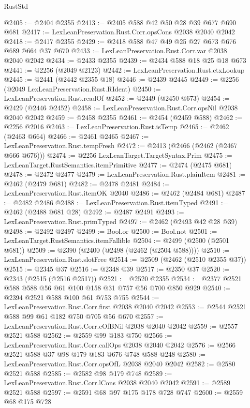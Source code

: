 \begin{lexlean}{RustStd}
\begin{coremodule}
@2405 := @2404 @2355
@2413 := @2405 @588 @42 @50 @28 @39 @677 @690 @681
@2417 := LexLeanPreservation.Rust.Corr.opsCons @2038 @2040 @2042
@2418 := @2417 @2355
@2429 := @2418 @588 @47 @49 @25 @27 @673 @676 @689 @664 @37 @670
@2433 := LexLeanPreservation.Rust.Corr.var @2038 @2040 @2042
@2434 := @2433 @2355
@2439 := @2434 @588 @18 @25 @18 @673
@2441 := @2256 (@2049 @2123)
@2442 := LexLeanPreservation.Rust.ctxLookup
@2445 := @2441 (@2442 @2355 @18)
@2446 := @2439 @2445
@2449 := @2256 (@2049 LexLeanPreservation.Rust.RIdent)
@2450 := LexLeanPreservation.Rust.readOf
@2452 := @2449 (@2450 @673)
@2454 := @2429 (@2446 @2452)
@2458 := LexLeanPreservation.Rust.Corr.opsNil @2038 @2040 @2042
@2459 := @2458 @2355
@2461 := @2454 (@2459 @588)
@2462 := @2256 @2016
@2463 := LexLeanPreservation.Rust.isTemp
@2465 := @2462 (@2463 @664)
@2466 := @2461 @2465
@2467 := LexLeanPreservation.Rust.tempFresh
@2472 := @2413 (@2466 (@2462 (@2467 @666 @676)))
@2474 := @2256 LexLeanTarget.TargetSyntax.Prim
@2475 := LexLeanTarget.RustSemantics.itemPrimitive
@2477 := @2474 (@2475 @681)
@2478 := @2472 @2477
@2479 := LexLeanPreservation.Rust.plainItem
@2481 := @2462 (@2479 @681)
@2482 := @2478 @2481
@2484 := LexLeanPreservation.Rust.itemOK @2040
@2486 := @2462 (@2484 @681)
@2487 := @2482 @2486
@2488 := LexLeanPreservation.Rust.itemTyped
@2491 := @2462 (@2488 @681 @28)
@2492 := @2487 @2491
@2493 := LexLeanPreservation.Rust.primTyped
@2497 := @2462 (@2493 @42 @28 @39)
@2498 := @2492 @2497
@2499 := Bool.or
@2500 := Bool.not
@2501 := LexLeanTarget.RustSemantics.itemFallible
@2504 := @2499 (@2500 (@2501 @681))
@2509 := @2390 (@2400 (@2498 (@2462 (@2504 @588))))
@2510 := LexLeanPreservation.Rust.slotFree
@2514 := @2509 (@2462 (@2510 @2355 @37))
@2515 := @2345 @37
@2516 := @2348 @39
@2517 := @2350 @37
@2520 := @2343 (@2515 (@2516 @2517))
@2521 := @2520 @2355
@2534 := @2377 @2521 @588 @588 @56 @61 @100 @158 @31 @757 @56 @700 @850 @929
@2540 := @2394 @2521 @588 @100 @61 @753 @755
@2544 := LexLeanPreservation.Rust.Corr.first @2038 @2040 @2042
@2553 := @2544 @2521 @588 @99 @61 @182 @750 @705 @56 @670
@2557 := LexLeanPreservation.Rust.Corr.eOfBNil @2038 @2040 @2042
@2559 := @2557 @2521 @588
@2562 := @2559 @99 @183 @750
@2566 := LexLeanPreservation.Rust.Corr.callOps @2038 @2040 @2042
@2576 := @2566 @2521 @588 @37 @98 @179 @183 @676 @748 @588 @248
@2580 := LexLeanPreservation.Rust.Corr.opsOfL @2038 @2040 @2042
@2582 := @2580 @2521 @588
@2585 := @2582 @98 @179 @748
@2589 := LexLeanPreservation.Rust.Corr.lCons @2038 @2040 @2042
@2591 := @2589 @2521 @588
@2597 := @2591 @68 @97 @175 @178 @728 @747
@2600 := @2559 @68 @175 @728

\end{coremodule}
\end{lexlean}

